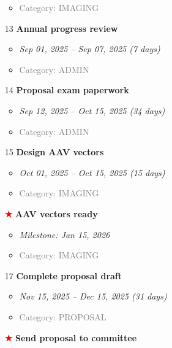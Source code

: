 \documentclass[portrait,a4paper]{article}
\begin{document}
\begin{enumerate}[leftmargin=0pt, itemindent=0pt, labelsep=0pt, labelwidth=0pt]
\begin{itemize}
        \item \textcolor{gray}{Category: IMAGING}
    \end{itemize}
\vspace{0.3cm}
\item[13] \textbf{Annual progress review}
    \begin{itemize}
        \item \textit{Sep 01, 2025 -- Sep 07, 2025 (7 days)}
        \item \textcolor{gray}{Category: ADMIN}
    \end{itemize}
\vspace{0.3cm}
\item[14] \textbf{Proposal exam paperwork}
    \begin{itemize}
        \item \textit{Sep 12, 2025 -- Oct 15, 2025 (34 days)}
        \item \textcolor{gray}{Category: ADMIN}
    \end{itemize}
\vspace{0.3cm}
\item[15] \textbf{Design AAV vectors}
    \begin{itemize}
        \item \textit{Oct 01, 2025 -- Oct 15, 2025 (15 days)}
        \item \textcolor{gray}{Category: IMAGING}
    \end{itemize}
\vspace{0.3cm}
\item[\textcolor{red}{\textbf{★}}] \textbf{AAV vectors ready}
    \begin{itemize}
        \item \textit{Milestone: Jan 15, 2026}
        \item \textcolor{gray}{Category: IMAGING}
    \end{itemize}
\vspace{0.3cm}
\item[17] \textbf{Complete proposal draft}
    \begin{itemize}
        \item \textit{Nov 15, 2025 -- Dec 15, 2025 (31 days)}
        \item \textcolor{gray}{Category: PROPOSAL}
    \end{itemize}
\vspace{0.3cm}
\item[\textcolor{red}{\textbf{★}}] \textbf{Send proposal to committee}
    \begin{itemize}

\end{itemize}
\end{enumerate}
\end{document}
